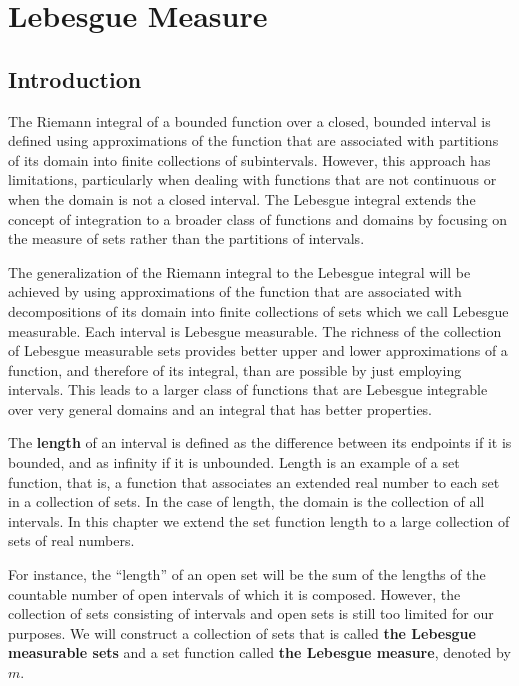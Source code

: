 \documentclass[../main.tex]{subfiles}
\begin{document}
\chapter{Lebesgue Measure}

\section{Introduction}
The Riemann integral of a bounded function over a closed, bounded interval is defined using approximations of the function that are associated with partitions of its domain into finite collections of subintervals. However, this approach has limitations, particularly when dealing with functions that are not continuous or when the domain is not a closed interval. The Lebesgue integral extends the concept of integration to a broader class of functions and domains by focusing on the measure of sets rather than the partitions of intervals.

The generalization of the Riemann integral to the Lebesgue integral will be achieved by using approximations of the function that are associated with decompositions of its domain into finite collections of sets which we call Lebesgue measurable. Each interval is Lebesgue measurable. The richness of the collection of Lebesgue measurable sets provides better upper and lower approximations of a function, and therefore of its integral, than are possible by just employing intervals. This leads to a larger class of functions that are Lebesgue integrable over very general domains and an integral that has better properties.

\begin{remark}
  The \textbf{length} of an interval is defined as the difference between its endpoints if it is bounded, and as infinity if it is unbounded. Length is an example of a set function, that is, a function that associates an extended real number to each set in a collection of sets. In the case of length, the domain is the collection of all intervals. In this chapter we extend the set function length to a large collection of sets of real numbers.

  For instance, the ``length'' of an open set will be the sum of the lengths of the countable number of open intervals of which it is composed. However, the collection of sets consisting of intervals and open sets is still too limited for our purposes. We will construct a collection of sets that is called \textbf{the Lebesgue measurable sets} and a set function called \textbf{the Lebesgue measure}, denoted by $m$.
\end{remark}
\end{document}
